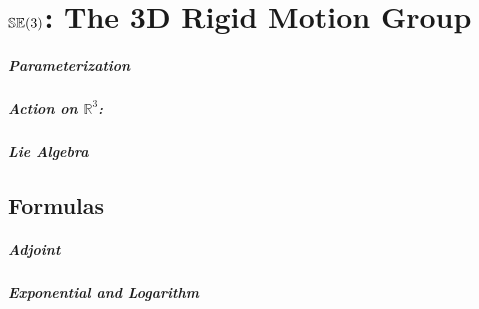 
\chapter{\texorpdfstring{${\mathbb{SE}(3)}$}{SE(3)}: The 3D Rigid Motion Group}

\paragraph{Parameterization}

\paragraph{Action on $\mathbb{R}^3$:}

\paragraph{Lie Algebra}

\section{Formulas}

\paragraph{Adjoint}

\paragraph{Exponential and Logarithm}

